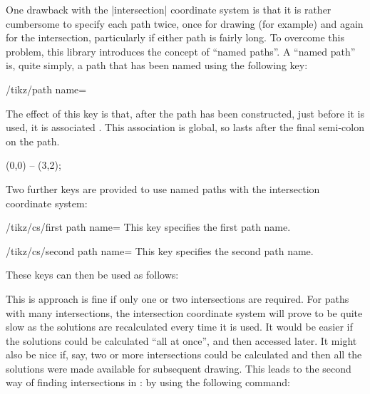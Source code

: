   One drawback with the |intersection| coordinate system is that
  it is rather cumbersome to specify each path twice, once for drawing
  (for example) and again for the intersection, particularly if
  either path is fairly long. To overcome this problem, this library 
  introduces the concept of ``named paths''. A ``named path'' is, 
  quite simply, a path that has been named using the following key:
  
\begin{key}{/tikz/path name=}

	The effect of this key is that, after the path has been constructed,
  just before it is used, it is associated . This 
  association is global, so lasts after the final semi-colon on the
  path.
  
\begin{codeexample}
\draw [path name=straight line] (0,0) -- (3,2);
\end{codeexample}
 
\end{key}

  Two further keys are provided to use named paths with the
  intersection coordinate system:
  
\begin{key}{/tikz/cs/first path name=}
  This key specifies the first path name.
\end{key}

\begin{key}{/tikz/cs/second path name=}
  This key specifies the second path name.
\end{key}

These keys can then be used as follows:
  
\begin{codeexample}[]
\end{codeexample}

  This is approach is fine if only one or two intersections are 
  required. For paths with many intersections, the intersection
  coordinate system will prove to be quite slow as the solutions 
  are recalculated every time it is used. It would be
  easier if the solutions could be calculated ``all at once'', and
  then accessed later. It might also be nice if, say, two or
  more intersections could be calculated and then all the solutions
  were made available for subsequent drawing. This leads to the
  second way of finding intersections in \tikzname: by using the
  following command:


